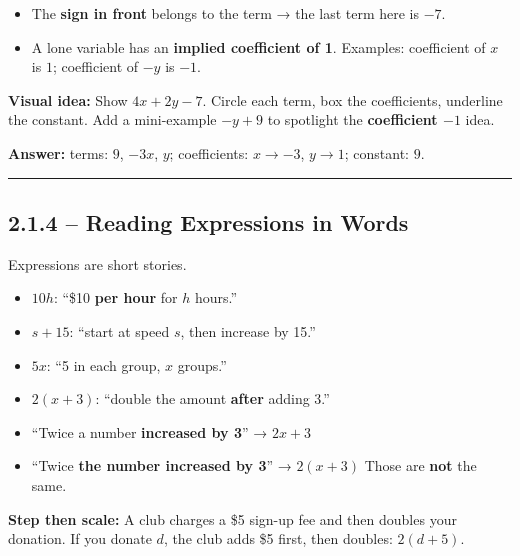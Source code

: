 \documentclass[
  letterpaper,
  DIV=11,
  numbers=noendperiod]{scrreprt}
\providecommand{\tightlist}{%
  \setlength{\itemsep}{0pt}\setlength{\parskip}{0pt}}
\begin{document}
\begin{itemize}
\tightlist
\item
  The \textbf{sign in front} belongs to the term → the last term here is
  \textbf{\(-7\)}.
\item
  A lone variable has an \textbf{implied coefficient of 1}. Examples:
  coefficient of \(x\) is \(1\); coefficient of \(-y\) is \(-1\).
\end{itemize}

\textbf{Visual idea:} Show \(4x + 2y - 7\). Circle each term, box the
coefficients, underline the constant. Add a mini-example \(-y + 9\) to
spotlight the \textbf{coefficient \(-1\)} idea.

\textbf{Answer:} terms: \(9\), \(-3x\), \(y\); coefficients:
\(x \to -3\), \(y \to 1\); constant: \(9\).

\begin{center}\rule{0.5\linewidth}{0.5pt}\end{center}

\subsection*{2.1.4 -- Reading Expressions in
Words}\label{reading-expressions-in-words}

Expressions are short stories.

\begin{itemize}
\tightlist
\item
  \(10h\): ``\$10 \textbf{per hour} for \(h\) hours.''
\item
  \(s + 15\): ``start at speed \(s\), then increase by 15.''
\item
  \(5x\): ``5 in each group, \(x\) groups.''
\item
  \(2(x + 3)\): ``double the amount \textbf{after} adding 3.''
\end{itemize}

\begin{itemize}
\tightlist
\item
  ``Twice a number \textbf{increased by 3}'' → \(2x + 3\)
\item
  ``Twice \textbf{the number increased by 3}'' → \(2(x + 3)\) Those are
  \textbf{not} the same.
\end{itemize}

\textbf{Step then scale:} A club charges a \$5 sign-up fee and then
doubles your donation. If you donate \(d\), the club adds \$5 first,
then doubles: \(2(d + 5)\).
\end{document}
